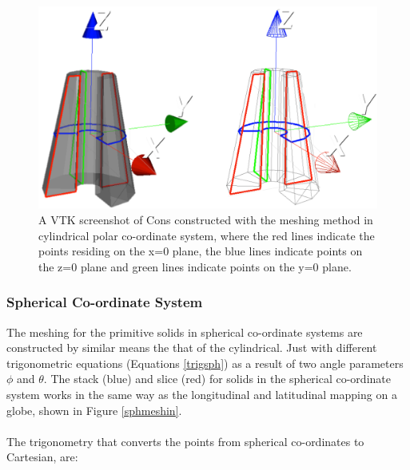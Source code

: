 \documentclass[12pt,a4paper]{article}
\begin{document}
\begin{figure}[h!]
\centering
\includegraphics[scale=0.3]{Images//Coords//consco.png}
\caption[width=\columnwidth]{A VTK screenshot of Cons constructed with the meshing method in cylindrical polar co-ordinate system, where the red lines indicate the points residing on the x=0 plane, the blue lines indicate points on the z=0 plane and green lines indicate points on the y=0 plane.}
\label{consco}
\end{figure}


\subsubsection{Spherical Co-ordinate System}

The meshing for the primitive solids in spherical co-ordinate systems are constructed by similar means the that of the cylindrical. Just with different trigonometric equations (Equations \ref{trigsph}) as a result of two angle parameters $\phi$ and $\theta$. The stack (blue) and slice (red) for solids in the spherical co-ordinate system works in the same way as the longitudinal and latitudinal mapping on a globe, shown in Figure \ref{sphmeshin}. 
\\\\
The trigonometry that converts the points from spherical co-ordinates to Cartesian, are:
\end{document}
